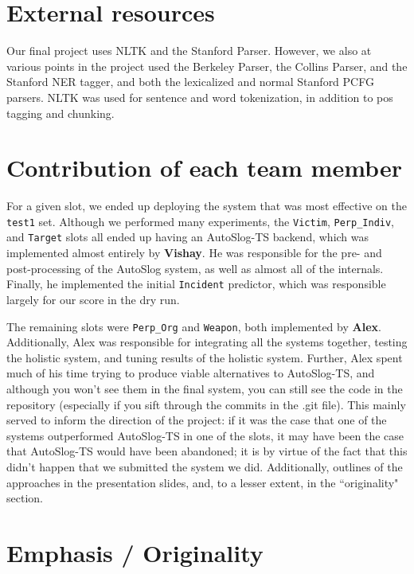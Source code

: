 \documentclass[11pt]{myclass}
\begin{document}
\section{External resources}

Our final project uses NLTK and the Stanford Parser. However, we also at various points in the project used the Berkeley Parser, the Collins Parser, and the Stanford NER tagger, and both the lexicalized and normal Stanford PCFG parsers. NLTK was used for sentence and word tokenization, in addition to pos tagging and chunking.

\section{Contribution of each team member}

For a given slot, we ended up deploying the system that was most effective on the \texttt{test1} set. Although we performed many experiments, the \texttt{Victim}, \texttt{Perp\_Indiv}, and \texttt{Target} slots all ended up having an AutoSlog-TS backend, which was implemented almost entirely by \textbf{Vishay}. He was responsible for the pre- and post-processing of the AutoSlog system, as well as almost all of the internals. Finally, he implemented the initial \texttt{Incident} predictor, which was responsible largely for our score in the dry run.

The remaining slots were \texttt{Perp\_Org} and \texttt{Weapon}, both implemented by \textbf{Alex}. Additionally, Alex was responsible for integrating all the systems together, testing the holistic system, and tuning results of the holistic system. Further, Alex spent much of his time trying to produce viable alternatives to AutoSlog-TS, and although you won't see them in the final system, you can still see the code in the repository (especially if you sift through the commits in the .git file). This mainly served to inform the direction of the project: if it was the case that one of the systems outperformed AutoSlog-TS in one of the slots, it may have been the case that AutoSlog-TS would have been abandoned; it is by virtue of the fact that this didn't happen that we submitted the system we did. Additionally, outlines of the approaches in the presentation slides, and, to a lesser extent, in the ``originality" section.

\section{Emphasis / Originality}
\end{document}
